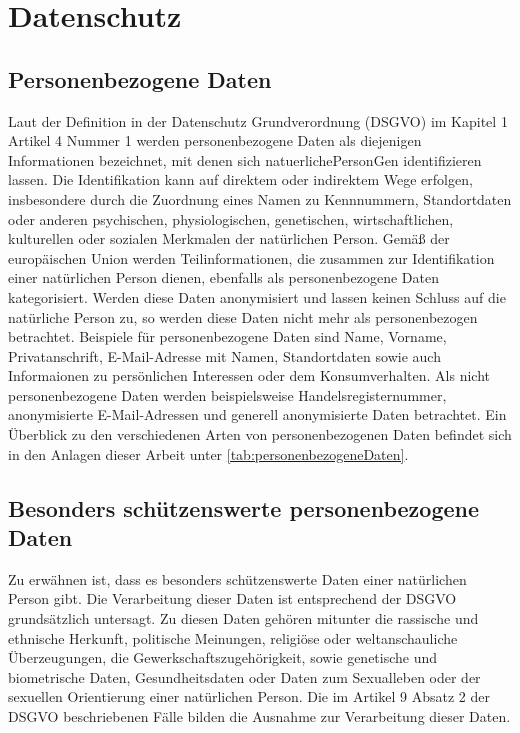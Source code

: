 \section{Datenschutz}
\subsection{Personenbezogene Daten}
Laut der Definition in der Datenschutz Grundverordnung (\gls{DSGVO}) im Kapitel 1 Artikel 4 Nummer 1 werden personenbezogene Daten als diejenigen Informationen bezeichnet, mit denen sich \gls{natuerlichePersonG}en identifizieren lassen. Die Identifikation kann auf direktem oder indirektem Wege erfolgen, insbesondere durch die Zuordnung eines Namen zu Kennnummern, Standortdaten oder anderen psychischen, physiologischen, genetischen, wirtschaftlichen, kulturellen oder sozialen Merkmalen der natürlichen Person. \cite{DSGVO_Art4} Gemäß der europäischen Union werden Teilinformationen, die zusammen zur Identifikation einer natürlichen Person dienen, ebenfalls als personenbezogene Daten kategorisiert. Werden diese Daten anonymisiert und lassen keinen Schluss auf die natürliche Person zu, so werden diese Daten nicht mehr als personenbezogen betrachtet. Beispiele für personenbezogene Daten sind Name, Vorname, Privatanschrift, E-Mail-Adresse mit Namen, Standortdaten sowie auch Informaionen zu persönlichen Interessen oder dem Konsumverhalten. Als nicht personenbezogene Daten werden beispielsweise Handelsregisternummer, anonymisierte E-Mail-Adressen und generell anonymisierte Daten betrachtet. \cite{PersBezDaten_2021} Ein Überblick zu den verschiedenen Arten von personenbezogenen Daten befindet sich in den Anlagen dieser Arbeit unter \ref{tab:personenbezogeneDaten}.

\subsection{Besonders schützenswerte personenbezogene Daten} \label{DSGVO_besonders}
Zu erwähnen ist, dass es besonders schützenswerte Daten einer natürlichen Person gibt. Die Verarbeitung dieser Daten ist entsprechend der DSGVO grundsätzlich untersagt. Zu diesen Daten gehören mitunter die rassische und ethnische Herkunft, politische Meinungen, religiöse oder weltanschauliche Überzeugungen, die Gewerkschaftszugehörigkeit, sowie genetische und biometrische Daten, Gesundheitsdaten oder Daten zum Sexualleben oder der sexuellen Orientierung einer natürlichen Person. Die im Artikel 9 Absatz 2 der DSGVO beschriebenen Fälle bilden die Ausnahme zur Verarbeitung dieser Daten. \cite{DSGVO_Art9}